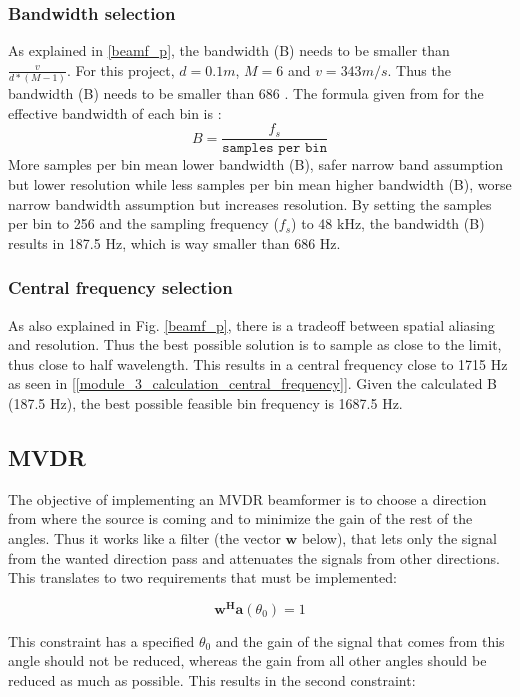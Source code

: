 \subsubsection{Bandwidth selection}
As explained in \ref{beamf_p}, the bandwidth (B) needs to be smaller than $\frac{v}{d*(M - 1)}$. For this project, $d = 0.1 m$, $M = 6$ and $v = 343 m/s$. Thus the bandwidth (B) needs to be smaller than 686 .
The formula given from \cite{IP3Man} for the effective bandwidth of each bin is : \begin{equation}
    B = \frac{f_s}{\texttt{samples per bin}}
\end{equation}
More samples per bin mean lower bandwidth (B), safer narrow band assumption but lower resolution while less samples per bin mean higher bandwidth (B), worse narrow bandwidth assumption but increases resolution.
By setting the samples per bin to 256 and the sampling frequency ($f_s$) to 48 kHz, the bandwidth (B) results in 187.5 Hz, which is way smaller than 686 Hz.

\label{central_frequency_selection}
\subsubsection{Central frequency selection}
As also explained in Fig. \ref{beamf_p}, there is a tradeoff between spatial aliasing and resolution. Thus the best possible solution is to sample as close to the limit, thus close to half wavelength. This results in a central frequency close to 1715 Hz as seen in [\ref{module_3_calculation_central_frequency}]. Given the calculated B  (187.5 Hz), the best possible feasible bin frequency is 1687.5 Hz.

\subsection{MVDR}

The objective of implementing an MVDR beamformer is to choose a direction from where the source is coming and to minimize the gain of the rest of the
angles. Thus it works like a filter (the vector $\textbf{w}$ below), that lets only the signal from the wanted direction pass and attenuates the signals from other directions. This translates to two requirements that must be implemented:

\begin{equation}
\textbf{w}^\textbf{H}\textbf{a}(\theta_0)=1
\end{equation}

\noindent This constraint has a specified $\theta_0$ and the gain of the signal that comes from this angle should not be reduced, whereas the gain from all other angles should be reduced as much as possible. This results in the second constraint:

